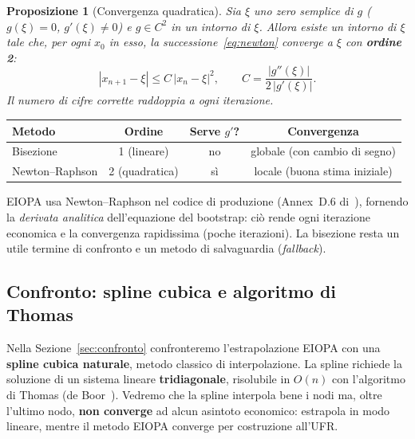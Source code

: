 \documentclass[11pt,a4paper]{article}
\theoremstyle{plain}
\newtheorem{proposizione}[teorema]{Proposizione}
\theoremstyle{definition}
\theoremstyle{remark}
\newcommand{\abs}[1]{\left\lvert #1 \right\rvert}
\begin{document}
\begin{proposizione}[Convergenza quadratica]
\label{prop:newton}
Sia $\xi$ uno zero semplice di $g$ ($g(\xi)=0$, $g'(\xi)\neq 0$) e $g\in C^2$ in un
intorno di $\xi$. Allora esiste un intorno di $\xi$ tale che, per ogni $x_0$ in esso,
la successione~\eqref{eq:newton} converge a $\xi$ con \textbf{ordine 2}:
\[
  \abs{x_{n+1} - \xi} \le C\,\abs{x_n - \xi}^2,
  \qquad C = \frac{\abs{g''(\xi)}}{2\,\abs{g'(\xi)}}.
\]
Il numero di cifre corrette \emph{raddoppia} a ogni iterazione.
\end{proposizione}

\begin{keybox}
\begin{center}\small
\renewcommand{\arraystretch}{1.2}
\begin{tabular}{lccc}
\toprule
\textbf{Metodo} & \textbf{Ordine} & \textbf{Serve $g'$?} & \textbf{Convergenza}\\
\midrule
Bisezione      & 1 (lineare)    & no  & globale (con cambio di segno)\\
Newton--Raphson& 2 (quadratica) & s\`i & locale (buona stima iniziale)\\
\bottomrule
\end{tabular}
\end{center}
EIOPA usa Newton--Raphson nel codice di produzione (Annex~D.6 di~\cite{eiopa2026}),
fornendo la \emph{derivata analitica} dell'equazione del bootstrap: ci\`o rende ogni
iterazione economica e la convergenza rapidissima (poche iterazioni). La bisezione
resta un utile termine di confronto e un metodo di salvaguardia (\emph{fallback}).
\end{keybox}

\subsection{Confronto: spline cubica e algoritmo di Thomas}
\label{sec:thomas}

Nella Sezione~\ref{sec:confronto} confronteremo l'estrapolazione EIOPA con una
\textbf{spline cubica naturale}, metodo classico di interpolazione. La spline richiede
la soluzione di un sistema lineare \textbf{tridiagonale}, risolubile in $O(n)$ con
l'algoritmo di Thomas (de Boor~\cite{deBoor1978}). Vedremo che la spline interpola bene
i nodi ma, oltre l'ultimo nodo, \textbf{non converge} ad alcun asintoto economico:
estrapola in modo lineare, mentre il metodo EIOPA converge per costruzione all'UFR.
\end{document}
